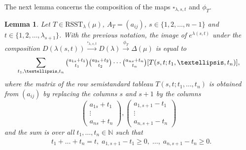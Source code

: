 \documentclass[11pt]{article}
\newtheorem{lemma}[theo]{Lemma}
\theoremstyle{definition}
\numberwithin{equation}{section}
\newcommand{\la}{\lambda}
\numberwithin{equation}{section}
\begin{document}
The next lemma concerns the composition of the maps $\square_{\la, s, t}$ and $\phi_T$.
\begin{lemma}\label{comp2}
	Let  $T \in \mathrm{RSST}_{\la}(\mu)$, $A_T=(a_{ij})$, $s \in \{1,2,\dots,n-1\}$ and $t \in \{1,2,\dots,\la_{s+1}\}$. With the previous notation, the image of $e^{\la(s,t)}$ under the composition $D(\la(s,t)) \xrightarrow{\square_{\la, s,t}} D(\la) \xrightarrow{\phi_T} \Delta(\mu) $ is equal to \begin{equation}\label{eq11}
		\sum_{t_1,\dots,t_{n}}\tbinom{a_{1s}+t_1}{t_1}\tbinom{a_{2s}+t_2}{t_2} \cdots \tbinom{a_{ns}+t_n}{t_n}[T(s,t;t_1,\dots,t_{n})],\end{equation}
	where the matrix  of the row semistandard tableau $T(s,t;t_1,\dots,t_{n})$ is obtained from $(a_{ij})$ by replacing the columns $s$ and $s+1$ by the columns \[\begin{pmatrix}a_{1s}+t_1 \\ \vdots \\ a_{ns}+t_n \end{pmatrix}, \begin{pmatrix}a_{1,s+1}-t_1 \\ \vdots \\ a_{n,s+1}-t_n \end{pmatrix}\]
	and the sum is over all $t_1,\dots,t_{n} \in \mathbb{N}$ such that \begin{align}\label{ineq111}&t_{1}+\dots+t_{n}=t, \; a_{1,s+1}-t_1 \ge 0, \; \dots, \; a_{n,s+1}-t_{n} \ge 0.\end{align}
\end{lemma}
\end{document}
